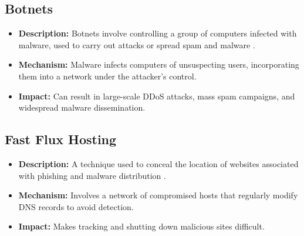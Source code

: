 \subsection{Botnets}
\begin{itemize}
    \item \textbf{Description:} Botnets involve controlling a group of computers infected with malware, used to carry out attacks or spread spam and malware \cite{citpyour}.
    \item \textbf{Mechanism:} Malware infects computers of unsuspecting users, incorporating them into a network under the attacker's control.
    \item \textbf{Impact:} Can result in large-scale DDoS attacks, mass spam campaigns, and widespread malware dissemination.
\end{itemize}

\subsection{Fast Flux Hosting}
\begin{itemize}
    \item \textbf{Description:} A technique used to conceal the location of websites associated with phishing and malware distribution \cite{lin2013genetic}.
    \item \textbf{Mechanism:} Involves a network of compromised hosts that regularly modify DNS records to avoid detection.
    \item \textbf{Impact:} Makes tracking and shutting down malicious sites difficult.
\end{itemize}

